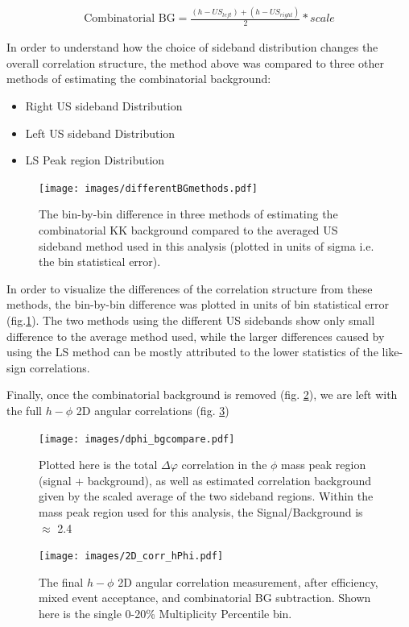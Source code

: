 \documentclass[ALICE,manyauthors]{ALICE_analysis_notes}
\begin{document}
\begin{align}
	\text{Combinatorial BG} = \frac{(h-US_{left}) + (h-US_{right})}{2}*{scale}
\end{align}

In order to understand how the choice of sideband distribution changes the overall correlation structure, the method above was compared to three other methods of estimating the combinatorial background:

\begin{itemize}
	\item Right US sideband Distribution
    \item Left US sideband Distribution
    \item LS Peak region Distribution
\end{itemize}

\begin{figure}[ht]
\centering
\texttt{[image: images/differentBGmethods.pdf]}
\caption{The bin-by-bin difference in three methods of estimating the combinatorial KK background compared to the averaged US sideband method used in this analysis (plotted in units of sigma i.e. the bin statistical error).}
\label{BGremoval}
\end{figure}

In order to visualize the differences of the correlation structure from these methods, the bin-by-bin difference was plotted in units of bin statistical error (fig.\ref{BGremoval}).  The two methods using the different US sidebands show only small difference to the average method used, while the larger differences caused by using the LS method can be mostly attributed to the lower statistics of the like-sign correlations.

Finally, once the combinatorial background is removed (fig. \ref{signalBGcorr}), we are left with the full $h-\phi$ 2D angular correlations (fig. \ref{hphi2D})

\begin{figure}[ht]
\centering
\texttt{[image: images/dphi\_bgcompare.pdf]}
\caption{Plotted here is the total $\Delta\varphi$ correlation in the $\phi$ mass peak region (signal + background), as well as estimated correlation background given by the scaled average of the two sideband regions.  Within the mass peak region used for this analysis, the Signal/Background is $\approx$ 2.4}
\label{signalBGcorr}
\end{figure}

\begin{figure}[ht]
\centering
\texttt{[image: images/2D\_corr\_hPhi.pdf]}
\caption{The final $h-\phi$ 2D angular correlation measurement, after efficiency, mixed event acceptance, and combinatorial BG subtraction. Shown here is the single 0-20\% Multiplicity Percentile bin. }
\label{hphi2D}
\end{figure}
\end{document}
